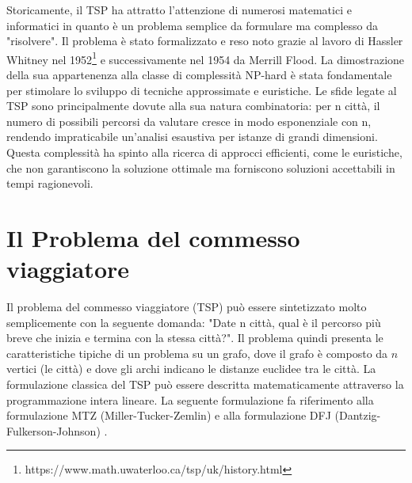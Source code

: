 \documentclass[a4paper,12pt]{report}
\begin{document}
Storicamente, il TSP ha attratto l'attenzione di numerosi matematici e informatici in quanto è un problema semplice da formulare ma complesso da "risolvere". Il problema è stato formalizzato e reso noto grazie al lavoro di Hassler Whitney nel 1952\footnote[1]{https://www.math.uwaterloo.ca/tsp/uk/history.html} e successivamente nel 1954 da Merrill Flood. La dimostrazione della sua appartenenza alla classe di complessità NP-hard è stata fondamentale per stimolare lo sviluppo di tecniche approssimate e euristiche. Le sfide legate al TSP sono principalmente dovute alla sua natura combinatoria: per n città, il numero di possibili percorsi da valutare cresce in modo esponenziale con n, rendendo impraticabile un'analisi esaustiva per istanze di grandi dimensioni. Questa complessità ha spinto alla ricerca di approcci efficienti, come le euristiche, che non garantiscono la soluzione ottimale ma forniscono soluzioni accettabili in tempi ragionevoli.

\section{Il Problema del commesso viaggiatore}
Il problema del commesso viaggiatore (TSP) può essere sintetizzato molto semplicemente con la seguente domanda: "Date n città, qual è il percorso più breve che inizia e termina con la stessa città?". Il problema quindi presenta le caratteristiche tipiche di un problema su un grafo, dove il grafo è composto da $n$ vertici (le città) e dove gli archi indicano le distanze euclidee tra le città. La formulazione classica del TSP può essere descritta matematicamente attraverso la programmazione intera lineare. La seguente formulazione fa riferimento alla formulazione MTZ (Miller-Tucker-Zemlin) e alla formulazione DFJ (Dantzig-Fulkerson-Johnson) \cite{TSP formulation}.
\end{document}
